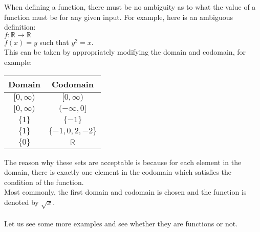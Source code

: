 \dotfill

When defining a function, there must be no ambiguity as to what the value of a function must be for any given input. For example, here is an ambiguous definition:\\
$f:\mathbb{R}\to\mathbb{R}$\\
$f(x) = y$ such that $y^2 = x$.\\
This can be taken by appropriately modifying the domain and codomain, for example:
\begin{center}
\begin{tabular}{|c|c|}
    \hline
    Domain & Codomain \\
    \hline
    $[0, \infty)$ & $[0, \infty)$\\
    $[0, \infty)$ & $(-\infty, 0]$\\
    $\{1\}$ & $\{-1\}$\\
    $\{1\}$ & $\{-1, 0, 2, -2\}$\\
    $\{0\}$ & $\mathbb{R}$\\
    \hline
\end{tabular}
\end{center}
The reason why these sets are acceptable is because for each element in the domain, there is exactly one element in the codomain which satisfies the condition of the function.\\
Most commonly, the first domain and codomain is chosen and the function is denoted by $\sqrt{x}$.\\~\\
Let us see some more examples and see whether they are functions or not.\\
